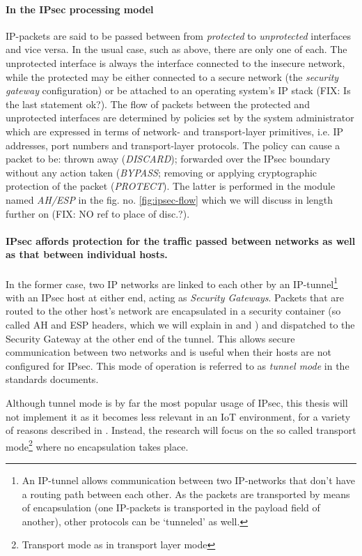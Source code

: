 \documentclass[final,a4paper,twoside,11pt,onecolumn]{report}
\begin{document}
\label{ipsec_proc}
\paragraph{In the IPsec processing model} IP-packets are said to be passed between from \emph{protected} to \emph{unprotected} interfaces and vice versa. In the usual case, such as above, there are only one of each. The unprotected interface is always the interface connected to the insecure network, while the protected may be either connected to a secure network (the \emph{security gateway} configuration) or be attached to an operating system's IP stack (FIX: Is the last statement ok?). The flow of packets between the protected and unprotected interfaces are determined by policies set by the system administrator which are expressed in terms of network- and transport-layer primitives, i.e. IP addresses, port numbers and transport-layer protocols. The policy can cause a packet to be: thrown away (\emph{DISCARD}); forwarded over the IPsec boundary without any action taken (\emph{BYPASS}; removing or applying cryptographic protection of the packet (\emph{PROTECT}). The latter is performed in the module named \emph{AH/ESP} in the fig. no. \ref{fig:ipsec-flow} which we will discuss in length further on (FIX: NO ref to place of disc.?).

\paragraph{IPsec affords protection for the traffic passed between networks as well as that between individual hosts.} In the former case, two IP networks are linked to each other by an IP-tunnel\footnote{An IP-tunnel allows communication between two IP-networks that don't have a routing path between each other. As the packets are transported by means of encapsulation (one IP-packets is transported in the payload field of another), other protocols can be `tunneled'  as well.} with an IPsec host at either end, acting as \emph{Security Gateways}. Packets that are routed to the other host's network are encapsulated in a security container (so called AH and ESP headers, which we will explain in  and ) and dispatched to the Security Gateway at the other end of the tunnel. This allows secure communication between two networks and is useful when their hosts are not configured for IPsec. This mode of operation is referred to as \emph{tunnel mode} in the standards documents.

Although tunnel mode is by far the most popular usage of IPsec, this thesis will not implement it as it becomes less relevant in an IoT environment, for a variety of reasons described in . Instead, the research will focus on the so called transport mode\footnote{Transport mode as in transport layer mode} where no encapsulation takes place.
\end{document}
